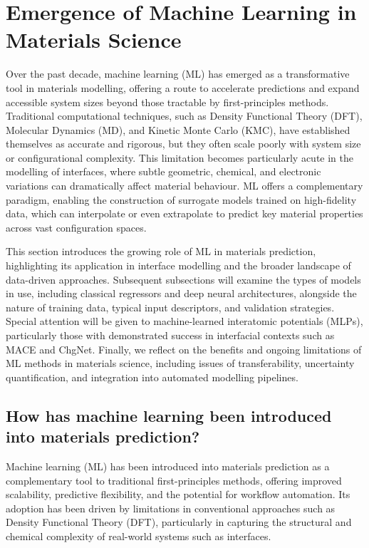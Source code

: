 \section{Emergence of Machine Learning in Materials Science} \label{section:machine_learning}

Over the past decade, machine learning (ML) has emerged as a transformative tool in materials modelling, offering a route to accelerate predictions and expand accessible system sizes beyond those tractable by first-principles methods. Traditional computational techniques, such as Density Functional Theory (DFT), Molecular Dynamics (MD), and Kinetic Monte Carlo (KMC), have established themselves as accurate and rigorous, but they often scale poorly with system size or configurational complexity. This limitation becomes particularly acute in the modelling of interfaces, where subtle geometric, chemical, and electronic variations can dramatically affect material behaviour. ML offers a complementary paradigm, enabling the construction of surrogate models trained on high-fidelity data, which can interpolate or even extrapolate to predict key material properties across vast configuration spaces.

This section introduces the growing role of ML in materials prediction, highlighting its application in interface modelling and the broader landscape of data-driven approaches. Subsequent subsections will examine the types of models in use, including classical regressors and deep neural architectures, alongside the nature of training data, typical input descriptors, and validation strategies. Special attention will be given to machine-learned interatomic potentials (MLPs), particularly those with demonstrated success in interfacial contexts such as MACE and ChgNet. Finally, we reflect on the benefits and ongoing limitations of ML methods in materials science, including issues of transferability, uncertainty quantification, and integration into automated modelling pipelines.

\subsection{How has machine learning been introduced into materials prediction?}

Machine learning (ML) has been introduced into materials prediction as a complementary tool to traditional first-principles methods, offering improved scalability, predictive flexibility, and the potential for workflow automation. Its adoption has been driven by limitations in conventional approaches such as Density Functional Theory (DFT), particularly in capturing the structural and chemical complexity of real-world systems such as interfaces.

